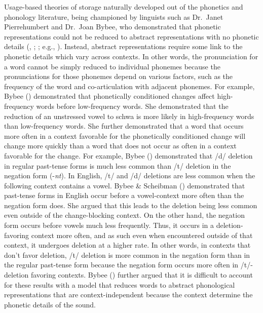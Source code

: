 \documentclass[
  12pt,
  letterpaper,
]{scrreprt}
\begin{document}
Usage-based theories of storage naturally developed out of the phonetics
and phonology literature, being championed by linguists such as
Dr.~Janet Pierrehumbert and Dr.~Joan Bybee, who demonstrated that
phonetic representations could not be reduced to abstract
representations with no phonetic details
(,
;
;
e.g.,
). Instead, abstract representations require some link to the
phonetic details which vary across contexts. In other words, the
pronunciation for a word cannot be simply reduced to individual phonemes
because the pronunciations for those phonemes depend on various factors,
such as the frequency of the word and co-articulation with adjacent
phonemes. For example, Bybee
() demonstrated that
phonetically conditioned changes affect high-frequency words before
low-frequency words. She demonstrated that the reduction of an
unstressed vowel to schwa is more likely in high-frequency words than
low-frequency words. She further demonstrated that a word that occurs
more often in a context favorable for the phonetically conditioned
change will change more quickly than a word that does not occur as often
in a context favorable for the change. For example, Bybee
() demonstrated that
/d/ deletion in regular past-tense forms is much less common than /t/
deletion in the negation form (-\emph{nt}). In English, /t/ and /d/
deletions are less common when the following context contains a vowel.
Bybee \& Scheibman ()
demonstrated that past-tense forms in English occur before a
vowel-context more often than the negation form does. She argued that
this leads to the deletion being less common even outside of the
change-blocking context. On the other hand, the negation form occurs
before vowels much less frequently. Thus, it occurs in a
deletion-favoring context more often, and as such even when encountered
outside of that context, it undergoes deletion at a higher rate. In
other words, in contexts that don't favor deletion, /t/ deletion is more
common in the negation form than in the regular past-tense form because
the negation form occurs more often in /t/-deletion favoring contexts.
Bybee () further
argued that it is difficult to account for these results with a model
that reduces words to abstract phonological representations that are
context-independent because the context determine the phonetic details
of the sound.
\end{document}

